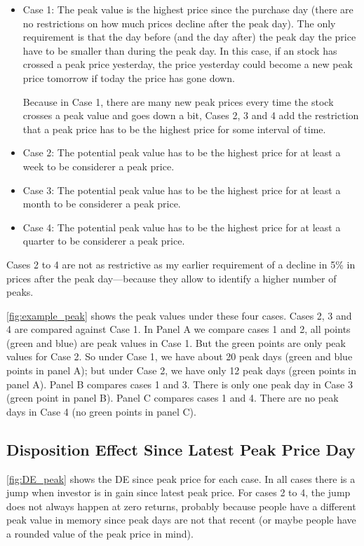 \begin{itemize}
	\item Case 1: The peak value is the highest price since the purchase day (there are no restrictions on how much prices decline after the peak day). The only requirement is that the day before (and the day after) the peak day the price have to be smaller than during the peak day. In this case, if an stock has crossed a peak price yesterday, the price yesterday could become a new peak price tomorrow if today the price has gone down.
	
	Because in Case 1, there are many new peak prices every time the stock crosses a peak value and goes down a bit, Cases 2, 3 and 4 add the restriction that a peak price has to be the highest price for some interval of time.
	
	\item Case 2: The potential peak value has to be the highest price for at least a week to be considerer a peak price.
	\item  Case 3: The potential peak value has to be the highest price for at least a month to be considerer a peak price.
	\item  Case 4: The potential peak value has to be the highest price for at least a quarter to be considerer a peak price.	
	
\end{itemize}


Cases 2 to 4 are not as restrictive as my earlier requirement of a decline in 5\% in prices after the peak day---because they allow to identify a higher number of peaks. 

\ref{fig:example_peak} shows the peak values under these four cases. Cases 2, 3 and 4 are compared against Case 1. In Panel A we compare cases 1 and 2, all points (green and blue) are peak values in Case 1. But the green points are only peak values for Case 2. So under Case 1, we have about 20 peak days (green and blue points in panel A); but under Case 2, we have only 12 peak days (green points in panel A). Panel B compares cases 1 and 3. There is only one peak day in Case 3 (green point in panel B). Panel C compares cases 1 and 4. There are no peak days in Case 4 (no green points in panel C).

\subsection{Disposition Effect Since Latest Peak Price Day}

\ref{fig:DE_peak} shows the DE since peak price for each case. In all cases there is a jump when investor is in gain since latest peak price. For cases 2 to 4, the jump does not always happen at zero returns, probably because people have a different peak value in memory since peak days are not that recent (or maybe people have a rounded value of the peak price in mind).

